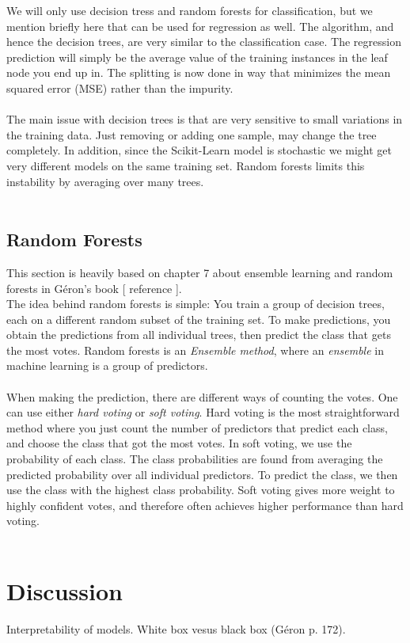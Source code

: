 \documentclass[12pt]{article}
\numberwithin{figure}{section}
\newcommand{\husk}[1]{\color{red} #1 \color{black}}
\begin{document}
We will only use decision tress and random forests for classification, but we mention briefly here that can be used for regression as well. The algorithm, and hence the decision trees, are very similar to the classification case. The regression prediction will simply be the average value of the training instances in the leaf node you end up in. The splitting is now done in way that minimizes the mean squared error (MSE) rather than the impurity.\\ \\
The main issue with decision trees is that are very sensitive to small variations in the training data. Just removing or adding one sample, may change the tree completely. In addition, since the Scikit-Learn model is stochastic we might get very different models on the same training set.  Random forests limits this instability by averaging over many trees.\\ \\

\subsection{Random Forests}
This section is heavily based on chapter 7 about ensemble learning and random forests in Géron's book [\husk{reference}].\\
The idea behind random forests is simple: You train a group of decision trees, each on a different random subset of the training set. To make predictions, you obtain the predictions from all individual trees, then predict the class that gets the most votes. Random forests is an \textit{Ensemble method}, where an \textit{ensemble} in machine learning is  a group of predictors.\\ \\
When making the prediction, there are different ways of counting the votes. One can use either \textit{hard voting} or \textit{soft voting}. Hard voting is the most straightforward method where you just count the number of predictors that predict each class, and choose the class that got the most votes. In soft voting, we use the probability of each class. The class probabilities are found from averaging the predicted probability over all individual predictors. To predict the class, we then use the class with the highest class probability. Soft voting gives more weight to highly confident votes, and therefore often achieves higher performance than hard voting.\\ \\


\section{Discussion}
Interpretability of models. White box vesus black box (Géron p. 172).
\end{document}
